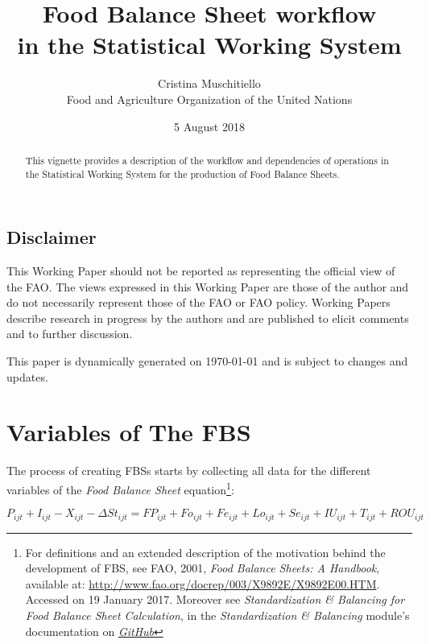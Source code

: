 \documentclass[]{article}
\title{Food Balance Sheet workflow\\
in the Statistical Working System}
\author{Cristina Muschitiello\\
Food and Agriculture Organization of the United Nations}
\date{5 August 2018}
\let\rmarkdownfootnote\footnote%
\def\footnote{\protect\rmarkdownfootnote}
\begin{document}
\maketitle
\begin{abstract}
This vignette provides a description of the workflow and dependencies of
operations in the Statistical Working System for the production of Food
Balance Sheets.
\end{abstract}

{
\setcounter{tocdepth}{4}
\tableofcontents
}
\listoftables

\listoffigures

\newpage

\subsection*{Disclaimer}\label{disclaimer}

This Working Paper should not be reported as representing the official
view of the FAO. The views expressed in this Working Paper are those of
the author and do not necessarily represent those of the FAO or FAO
policy. Working Papers describe research in progress by the authors and
are published to elicit comments and to further discussion.

This paper is dynamically generated on \today{} and is subject to
changes and updates.

\section*{Variables of The FBS}\label{variables-of-the-fbs}

The process of creating FBSs starts by collecting all data for the
different variables of the \emph{Food Balance Sheet} equation\footnote{For
  definitions and an extended description of the motivation behind the
  development of FBS, see FAO, 2001, \emph{Food Balance Sheets: A
  Handbook}, available at:
  \url{http://www.fao.org/docrep/003/X9892E/X9892E00.HTM}. Accessed on
  19 January 2017. Moreover see \emph{Standardization \& Balancing for
  Food Balance Sheet Calculation}, in the \emph{Standardization \&
  Balancing} module's documentation on
  \href{https://github.com/SWS-Methodology/faoswsStandardization/tree/master/documentation}{\emph{GitHub}}}:

\begin{equation}
\label{eq:balance1}
P_{ijt} + I_{ijt} - X_{ijt} - \Delta St_{ijt} = FP_{ijt} + Fo_{ijt} + Fe_{ijt} + Lo_{ijt} + Se_{ijt} + IU_{ijt} + T_{ijt}  + ROU_{ijt}
\end{equation}
\end{document}
